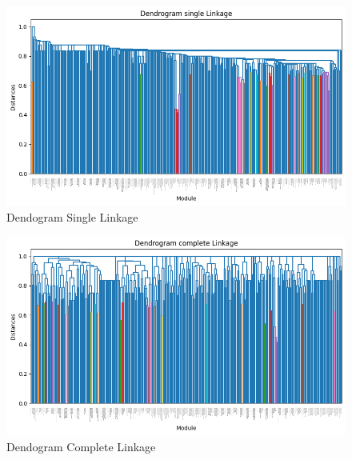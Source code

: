 \begin{figure}[htbp]
	\centering
	\begin{minipage}{1\textwidth}
		\centering
		\includegraphics[width=1\textwidth]{img/bab_4/single_dd.png}
		\caption{Dendogram Single Linkage }
		\label{fig:dd_single}
	\end{minipage}\hfill	
\end{figure}

\begin{figure}[htbp]
	\centering
	\begin{minipage}{1\textwidth}
		\centering
		\includegraphics[width=1\textwidth]{img/bab_4/complete_dd.png}
		\caption{Dendogram Complete Linkage }
		\label{fig:dd_complete}
	\end{minipage}\hfill	
\end{figure}

